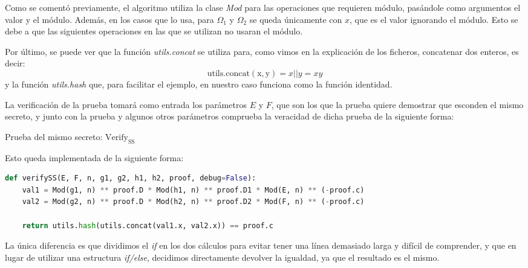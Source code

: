 Como se comentó previamente, el algoritmo utiliza la clase \textit{Mod} para las operaciones que requieren módulo, pasándole como argumentos el valor y el módulo. Además, en los casos que lo usa, para $\Omega_{1}$ y $\Omega_{2}$ se queda únicamente con $x$, que es el valor ignorando el módulo. Esto se debe a que las siguientes operaciones en las que se utilizan no usaran el módulo.

Por último, se puede ver que la función \textit{utils.concat} se utiliza para, como vimos en la explicación de los ficheros, concatenar dos enteros, es decir:
$$\operatorname{utils.concat(x, y)} = x||y = xy$$
y la función \textit{utils.hash} que, para facilitar el ejemplo, en nuestro caso funciona como la función identidad.

La verificación de la prueba tomará como entrada los parámetros $E$ y $F$, que son los que la prueba quiere demostrar que esconden el mismo secreto, y junto con la prueba y algunos otros parámetros comprueba la veracidad de dicha prueba de la siguiente forma: \\
\begin{minipage}{0.9\textwidth}
    \begin{algorithm}[H]
        \caption{Prueba del mismo secreto: $\operatorname{Verify_{SS}}$}
         
    \end{algorithm}
\end{minipage}

Esto queda implementada de la siguiente forma:
\begin{lstlisting}[language=Python, basicstyle=\footnotesize]
def verifySS(E, F, n, g1, g2, h1, h2, proof, debug=False):
    val1 = Mod(g1, n) ** proof.D * Mod(h1, n) ** proof.D1 * Mod(E, n) ** (-proof.c)
    val2 = Mod(g2, n) ** proof.D * Mod(h2, n) ** proof.D2 * Mod(F, n) ** (-proof.c)

    return utils.hash(utils.concat(val1.x, val2.x)) == proof.c
\end{lstlisting}

La única diferencia es que dividimos el \textit{if} en los dos cálculos para evitar tener una línea demasiado larga y difícil de comprender, y que en lugar de utilizar una estructura \textit{if/else}, decidimos directamente devolver la igualdad, ya que el resultado es el mismo.

